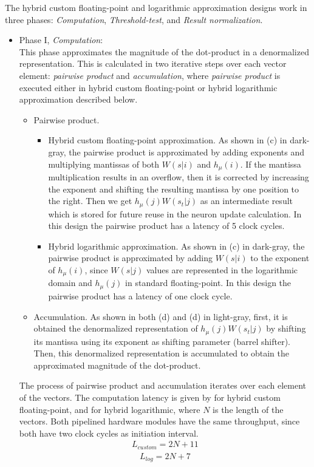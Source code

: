  The hybrid custom floating-point and logarithmic approximation designs work in three phases: \emph{Computation}, \emph{Threshold-test}, and \emph{Result normalization}.
 
 \begin{itemize}
 	\item{Phase I, \emph{Computation}}: 
 	\\This phase approximates the magnitude of the dot-product in a denormalized representation. This is calculated in two iterative steps over each vector element: \emph{pairwise product} and \emph{accumulation}, where \emph{pairwise product} is executed either in hybrid custom floating-point or hybrid logarithmic approximation described below.
 	 \begin{itemize}[label={--}]
 	 	\item{Pairwise product}.
 	 	\begin{itemize} [label={--}]
	 		\item{Hybrid custom floating-point approximation}.
	 	 	As shown in (c) in dark-gray, the pairwise product is approximated by adding exponents and multiplying mantissas of both $W(s|i)$ and $h_\mu(i)$. If the mantissa multiplication results in an overflow, then it is corrected by increasing the  exponent and shifting the resulting mantissa by one position to the right. Then we get $h_\mu(j) W(s_t|j)$ as an intermediate result which is stored for future reuse in the neuron update calculation. In this design the pairwise product has a latency of 5 clock cycles.
	 	 	\item{Hybrid logarithmic approximation}.
	 	 	As shown in (c) in dark-gray, the pairwise product is approximated by adding $W(s|i)$ to the exponent of $h_\mu(i)$, since $W(s|j)$ values are represented in the logarithmic domain and $h_\mu(j)$ in standard floating-point. In this design the pairwise product has a latency of one clock cycle.
 	 	\end{itemize}
 		\item{Accumulation}. As shown in both (d) and (d) in light-gray, first, it is obtained the denormalized representation of $h_\mu(j) W(s_t|j)$ by shifting its mantissa using its exponent as shifting parameter (barrel shifter). Then, this denormalized representation is accumulated to obtain the approximated magnitude of the dot-product.
 	 \end{itemize}
 	The process of pairwise product and accumulation iterates over each element of the vectors. The computation latency is given by  for hybrid custom floating-point, and  for hybrid logarithmic, where $N$ is the length of the vectors. Both pipelined hardware modules have the same throughput, since both have two clock cycles as initiation interval. 	
 	\begin{eqnarray} \label{eq:dot_standard_custom_float_latency}
 	L_{custom}=2N+11
 	\end{eqnarray} 	
	\begin{eqnarray} \label{eq:dot_log_latency}
 	L_{log}=2N+7
 	\end{eqnarray}
 	

\end{itemize}
